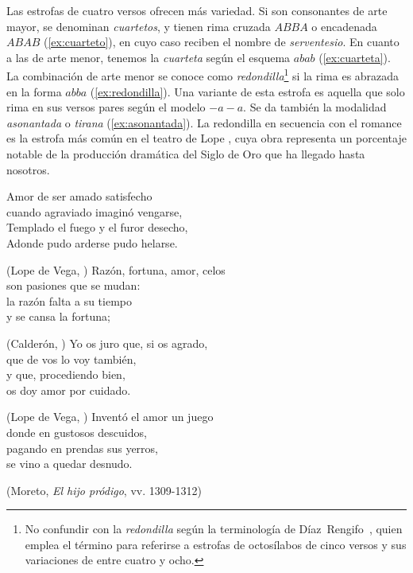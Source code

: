  	
Las estrofas de cuatro versos ofrecen más variedad. Si son consonantes de arte mayor, se denominan \textit{cuartetos}, y tienen rima cruzada $ABBA$ o encadenada $ABAB$ (\ref{ex:cuarteto}), en cuyo caso reciben el nombre de \textit{serventesio}. En cuanto a las de arte menor, tenemos la \textit{cuarteta} según el esquema $abab$ (\ref{ex:cuarteta}). La combinación de arte menor se conoce como \textit{redondilla}\footnote{No confundir con la \textit{redondilla} según la terminología de Díaz~Rengifo~\parencite*[193-207]{diazrengifo2012}, quien emplea el término para referirse a estrofas de octosílabos de cinco versos y sus variaciones de entre cuatro y ocho.} si la rima es abrazada en la forma $abba$ (\ref{ex:redondilla}). Una variante de esta estrofa es aquella que solo rima en sus versos pares según el modelo $-a-a$. Se da también la modalidad \textit{asonantada} o \textit{tirana} (\ref{ex:asonantada}). La redondilla en secuencia con el romance es la estrofa más común en el teatro de Lope \parencite[169]{fernandez2007}, cuya obra representa un porcentaje notable de la producción dramática del Siglo de Oro que ha llegado hasta nosotros. 

\begin{exe}
	\ex\label{ex:cuarteto}Amor de ser amado satisfecho\\
	cuando agraviado imaginó vengarse,\\
	Templado el fuego y el furor desecho,\\
	Adonde pudo arderse pudo helarse.\\
	\strut\hfill(Lope de Vega, )
	\ex\label{ex:cuarteta}Razón, fortuna, amor, celos\\
	son pasiones que se mudan:\\
	la razón falta a su tiempo\\
	y se cansa la fortuna;\\
	\strut\hfill(Calderón, )
	\ex\label{ex:redondilla}Yo os juro que, si os agrado,\\
	que de vos lo voy también,\\
	y que, procediendo bien,\\
	os doy amor por cuidado.\\
	\strut\hfill(Lope de Vega, )
	\ex\label{ex:asonantada}Inventó el amor un juego\\
	donde en gustosos descuidos,\\
	pagando en prendas sus yerros,\\
	se vino a quedar desnudo.\\
	\strut\hfill(Moreto, \textit{El hijo pródigo}, vv. 1309-1312\nocite{moreto_hijoprodigo})
\end{exe}

